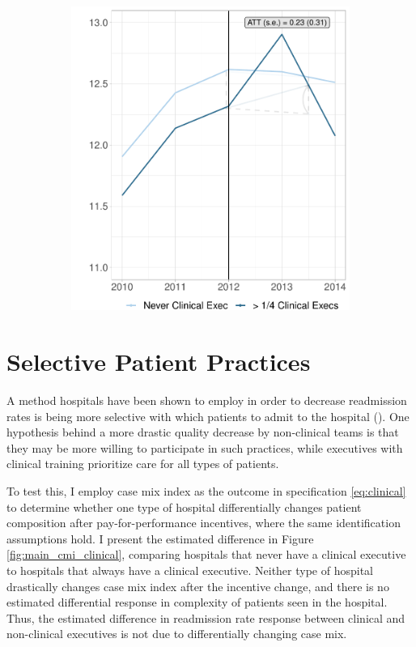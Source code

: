 \documentclass[12pt]{article}
\begin{document}
\begin{figure}[ht!]
\begin{subfigure}[b]{0.45\textwidth}
         \includegraphics[width=\textwidth]{Objects/cont_onehalfmort_md_nomd_synth_graph.pdf}
         \label{fig:onehalf_mort_synth_clinical}
     \end{subfigure}
        \label{fig:cont_clinicalsynthdid_mort}
    \end{figure}

    

    \section{Selective Patient Practices}

    A method hospitals have been shown to employ in order to decrease readmission rates is being more selective with which patients to admit to the hospital (\cite{gupta2021impacts}). One hypothesis behind a more drastic quality decrease by non-clinical teams is that they may be more willing to participate in such practices, while executives with clinical training prioritize care for all types of patients. 

    To test this, I employ case mix index as the outcome in specification \ref{eq:clinical} to determine whether one type of hospital differentially changes patient composition after pay-for-performance incentives, where the same identification assumptions hold. I present the estimated difference in Figure \ref{fig:main_cmi_clinical}, comparing hospitals that never have a clinical executive to hospitals that always have a clinical executive. Neither type of hospital drastically changes case mix index after the incentive change, and there is no estimated differential response in complexity of patients seen in the hospital. Thus, the estimated difference in readmission rate response between clinical and non-clinical executives is not due to differentially changing case mix. 
\end{document}
